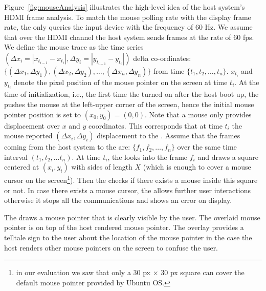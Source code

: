  Figure~\ref{fig:mouseAnalysis} illustrates the high-level idea of the host system's HDMI frame analysis. To match the mouse polling rate with the display frame rate, the \device only queries the input device with the frequency of $60$ Hz. We assume that over the HDMI channel the host system sends frames at the rate of $60$ fps. We define the mouse trace as the time series $(\Delta x_i = |x_{t_{i-1}} - x_{t_{i}}|, \Delta y_i=|y_{t_{i-1}} - y_{t_{i}}|)$ delta co-ordinates: $\{(\Delta x_1, \Delta y_1), (\Delta x_2, \Delta y_2), \ldots, (\Delta x_n, \Delta y_n)\}$ from time $\{t_1, t_2, \ldots, t_n\}$. $x_{t_{i}}$ and $y_{t_{i}}$ denote the pixel position of the mouse pointer on the screen at time $t_i$. At the time of initialization, i.e., the first time the \device turned on after the host boot up, the \device pushes the mouse at the left-upper corner of the screen, hence the initial mouse pointer position is set to $(x_0, y_0) = (0, 0)$.  
Note that a mouse only provides displacement over $x$ and $y$ coordinates. This corresponds that at time $t_i$ the mouse reported $(\Delta x_i, \Delta y_i)$ displacement to the \device. Assume that the frames coming from the host system to the \device are: $\{f_1, f_2, \ldots, f_n\}$ over the same time interval $(t_1, t_2,\ldots t_n)$. At time $t_i$, the \device looks into the frame $f_i$ and draws a square centered at $(x_i, y_i)$ with sides of length $X$ (which is enough to cover a mouse cursor on the screen\footnote{in our evaluation we saw that only a 30 px $\times$ 30 px square can cover the default mouse pointer provided by Ubuntu OS.}). Then the \device checks if there exists a mouse inside this square or not. In case there exists a mouse cursor, the \device allows further user interactions otherwise it stops all the communications and shows an error on display.

 The \device draws a mouse pointer that is clearly visible by the user. The overlaid mouse pointer is on top of the host rendered mouse pointer. The overlay provides a telltale sign to the user about the location of the mouse pointer in the case the host renders other mouse pointers on the screen to confuse the user.  



